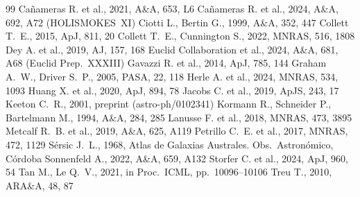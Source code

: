\documentclass[fleqn,usenatbib]{rasti}
\begin{document}
\begin{thebibliography}{99}
 Ca\~{n}ameras R. et al., 2021, A\&A, 653, L6
 Ca\~{n}ameras R. et al., 2024, A\&A, 692, A72 (HOLISMOKES~XI)
 Ciotti L., Bertin G., 1999, A\&A, 352, 447
 Collett T.~E., 2015, ApJ, 811, 20
 Collett T.~E., Cunnington S., 2022, MNRAS, 516, 1808
 Dey A. et al., 2019, AJ, 157, 168
 Euclid Collaboration et al., 2024, A\&A, 681, A68 (Euclid Prep.~XXXIII)
 Gavazzi R. et al., 2014, ApJ, 785, 144
 Graham A.~W., Driver S.~P., 2005, PASA, 22, 118
 Herle A. et al., 2024, MNRAS, 534, 1093
 Huang X. et al., 2020, ApJ, 894, 78
 Jacobs C. et al., 2019, ApJS, 243, 17
 Keeton C.~R., 2001, preprint (astro-ph/0102341)
 Kormann R., Schneider P., Bartelmann M., 1994, A\&A, 284, 285
 Lanusse F. et al., 2018, MNRAS, 473, 3895
 Metcalf R.~B. et al., 2019, A\&A, 625, A119
 Petrillo C.~E. et al., 2017, MNRAS, 472, 1129
 S\'{e}rsic J.~L., 1968, Atlas de Galaxias Australes. Obs.\ Astron\'{o}mico, C\'{o}rdoba
 Sonnenfeld A., 2022, A\&A, 659, A132
 Storfer C. et al., 2024, ApJ, 960, 54
 Tan M., Le Q.~V., 2021, in Proc.\ ICML, pp.\ 10096--10106
 Treu T., 2010, ARA\&A, 48, 87
\end{thebibliography}
\end{document}
